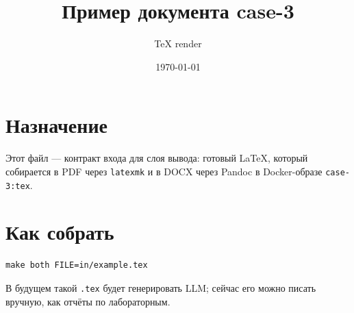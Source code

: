 \documentclass[a4paper,12pt]{article}
\title{Пример документа case-3}
\author{TeX render}
\date{\today}
\begin{document}
\maketitle

\section{Назначение}

Этот файл --- контракт входа для слоя вывода: готовый \LaTeX{},
который собирается в PDF через \texttt{latexmk} и в DOCX через Pandoc
в Docker-образе \texttt{case-3:tex}.

\section{Как собрать}

\begin{verbatim}
make both FILE=in/example.tex
\end{verbatim}

В будущем такой \texttt{.tex} будет генерировать LLM; сейчас его
можно писать вручную, как отчёты по лабораторным.
\end{document}
